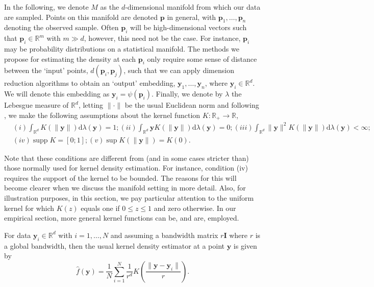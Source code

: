 \documentclass[12pt]{article}
\DeclareMathOperator\supp{supp}
\begin{document}
In the following, we denote \(M\) as the \(d\)-dimensional manifold from which our data are sampled. Points on this manifold are denoted \(\bm{p}\) in general, with \(\bm{p}_1,\dots,\bm{p}_n\) denoting the observed sample. Often \(\bm{p}_i\) will be high-dimensional vectors such that \(\bm{p}_i\in\mathbb{R}^m\) with \(m\gg d\), however, this need not be the case. For instance, \(\bm{p}_i\) may be probability distributions on a statistical manifold. The methods we propose for estimating the density at each \(\bm{p}_i\) only require some sense of distance between the `input' points, \(d(\bm{p}_i,\bm{p}_j)\), such that we can apply dimension reduction algorithms to obtain an `output' embedding, \(\bm{y}_1,\dots,\bm{y}_n\), where \(\bm{y}_i\in\mathbb{R}^d\). We will denote this embedding as \(\bm{y}_i=\psi(\bm{p}_i)\). Finally, we denote by \(\lambda\) the Lebesgue measure of \(\mathbb{R}^d\), letting \(\|\cdot\|\) be the usual Euclidean norm and following \textcite{Pelletier2005-vu}, we make the following assumptions about the kernel function \(K:\mathbb{R}_+\rightarrow\mathbb{R}\),
\begin{equation}
\begin{aligned}
\label{eq:kernelcondition}
& (i) \int_{\mathbb{R}^{d}} K(\|\bm{y}\|) \mathrm{d} \lambda(\bm{y})=1;
(ii) \int_{\mathbb{R}^{d}} \bm{y} K(\|\bm{y}\|) \mathrm{d} \lambda(\bm{y})=0;
(iii) \int_{\mathbb{R}^{d}}\|\bm{y}\|^{2} K(\|\bm{y}\|) \mathrm{d} \lambda(\bm{y})<\infty; \\
& (iv) \supp K=[0; 1];
(v) \sup K(\|\bm{y}\|)=K(0).
\end{aligned}
\end{equation}

Note that these conditions are different from (and in some cases stricter than) those normally used for kernel density estimation. For instance, condition (iv) requires the support of the kernel to be bounded. The reasons for this will become clearer when we discuss the manifold setting in more detail. Also, for illustration purposes, in this section, we pay particular attention to the uniform kernel for which \(K(z)\) equals one if \(0\leq z\leq1\) and zero otherwise. In our empirical section, more general kernel functions can be, and are, employed.

For data \(\bm{y}_i\in\mathbb{R}^d\) with \(i=1,\dots,N\) and assuming a bandwidth matrix \(r\bm{I}\) where \(r\) is a global bandwidth, then the usual kernel density estimator at a point \(\bm{y}\) is given by
\begin{equation}
\label{eq:vkde}
\hat{f}(\bm{y})=\frac{1}{N}\sum\limits_{i=1}^N \frac{1}{r^d} K\left(\frac{\|\bm{y}-\bm{y}_i\|}{r}\right).
\end{equation}
\end{document}
